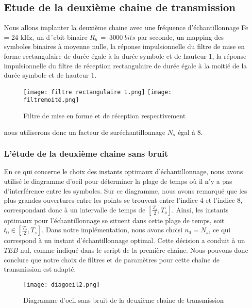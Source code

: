 \documentclass[11pt]{article}
\begin{document}
    \subsection{Etude de la deuxième chaine de transmission}
Nous allons implanter la deuxième chaine avec une fréquence d’échantillonnage
Fe = 24 kHz, un d´ebit binaire $R_b \ = \ 3000 \ bits$ par seconde, un mapping des symboles binaires à moyenne nulle, la réponse impulsionnelle du filtre de mise en forme rectangulaire de durée égale à la durée symbole et de hauteur 1, la réponse impulsionnelle du filtre de réception  rectangulaire de durée égale à la moitié de la durée symbole et de hauteur 1.
\begin{figure}[ht!]
            \centering
            \texttt{[image: filtre rectangulaire 1.png]}
            \texttt{[image: filtremoité.png]}
            \caption{Filtre de mise en forme et de réception respectivement
            \label{fig : filtre}}
\end{figure}
nous utiliserons donc un facteur de suréchantillonnage $N_s$ égal à 8.

\subsubsection{L'étude de la deuxième chaine sans bruit}

   En ce qui concerne le choix des instants optimaux d'échantillonnage, nous avons utilisé le diagramme d'oeil pour déterminer la plage de temps où il n'y a pas d'interférence entre les symboles. Sur ce diagramme, nous avons remarqué que les plus grandes ouvertures entre les points se trouvent entre l'indice 4 et l'indice 8, correspondant donc à un intervalle de temps de $[\frac{T_s}{2}, T_s]$. Ainsi, les instants optimaux pour l'échantillonnage se situent dans cette plage de temps, soit $t_0 \in [\frac{T_s}{2}, T_s]$. Dans notre implémentation, nous avons choisi $n_0 = N_s$, ce qui correspond à un instant d'échantillonnage optimal. Cette décision a conduit à un $TEB$ nul, comme indiqué dans le script de la première chaîne. Nous pouvons donc conclure que notre choix de filtres et de paramètres pour cette chaîne de transmission est adapté.\\

   \begin{figure}[ht!]
            \centering
            \texttt{[image: diagoeil2.png]}
            \caption{Diagramme d'oeil sans bruit de la deuxième chaine de transmission
            \label{fig : Oeil}}
\end{figure}
\end{document}
